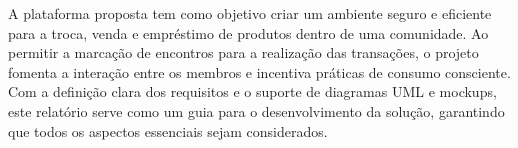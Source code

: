 \documentclass[a4paper, 12pt]{article} %
\begin{document}
A plataforma proposta tem como objetivo criar um ambiente seguro e eficiente para a troca, venda e empréstimo de produtos dentro de uma comunidade. Ao permitir a marcação de encontros para a realização das transações, o projeto fomenta a interação entre os membros e incentiva práticas de consumo consciente. 
Com a definição clara dos requisitos e o suporte de diagramas UML e mockups, este relatório serve como um guia para o desenvolvimento da solução, garantindo que todos os aspectos essenciais sejam considerados.







\end{document}
